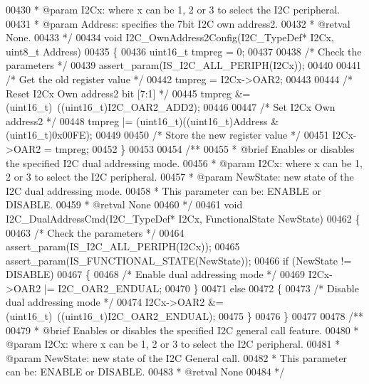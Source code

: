 \begin{DoxyCode}
00430 \textcolor{comment}{  * @param  I2Cx: where x can be 1, 2 or 3 to select the I2C peripheral.}
00431 \textcolor{comment}{  * @param  Address: specifies the 7bit I2C own address2.}
00432 \textcolor{comment}{  * @retval None.}
00433 \textcolor{comment}{  */}
00434 \textcolor{keywordtype}{void} I2C_OwnAddress2Config(I2C\_TypeDef* I2Cx, uint8\_t Address)
00435 \{
00436   uint16\_t tmpreg = 0;
00437 
00438   \textcolor{comment}{/* Check the parameters */}
00439   assert_param(IS\_I2C\_ALL\_PERIPH(I2Cx));
00440 
00441   \textcolor{comment}{/* Get the old register value */}
00442   tmpreg = I2Cx->OAR2;
00443 
00444   \textcolor{comment}{/* Reset I2Cx Own address2 bit [7:1] */}
00445   tmpreg &= (uint16\_t)~((uint16\_t)I2C_OAR2_ADD2);
00446 
00447   \textcolor{comment}{/* Set I2Cx Own address2 */}
00448   tmpreg |= (uint16\_t)((uint16\_t)Address & (uint16\_t)0x00FE);
00449 
00450   \textcolor{comment}{/* Store the new register value */}
00451   I2Cx->OAR2 = tmpreg;
00452 \}
00453 
00454 \textcolor{comment}{/**}
00455 \textcolor{comment}{  * @brief  Enables or disables the specified I2C dual addressing mode.}
00456 \textcolor{comment}{  * @param  I2Cx: where x can be 1, 2 or 3 to select the I2C peripheral.}
00457 \textcolor{comment}{  * @param  NewState: new state of the I2C dual addressing mode.}
00458 \textcolor{comment}{  *          This parameter can be: ENABLE or DISABLE.}
00459 \textcolor{comment}{  * @retval None}
00460 \textcolor{comment}{  */}
00461 \textcolor{keywordtype}{void} I2C_DualAddressCmd(I2C\_TypeDef* I2Cx, FunctionalState NewState)
00462 \{
00463   \textcolor{comment}{/* Check the parameters */}
00464   assert_param(IS\_I2C\_ALL\_PERIPH(I2Cx));
00465   assert_param(IS\_FUNCTIONAL\_STATE(NewState));
00466   \textcolor{keywordflow}{if} (NewState != DISABLE)
00467   \{
00468     \textcolor{comment}{/* Enable dual addressing mode */}
00469     I2Cx->OAR2 |= I2C_OAR2_ENDUAL;
00470   \}
00471   \textcolor{keywordflow}{else}
00472   \{
00473     \textcolor{comment}{/* Disable dual addressing mode */}
00474     I2Cx->OAR2 &= (uint16\_t)~((uint16\_t)I2C_OAR2_ENDUAL);
00475   \}
00476 \}
00477 
00478 \textcolor{comment}{/**}
00479 \textcolor{comment}{  * @brief  Enables or disables the specified I2C general call feature.}
00480 \textcolor{comment}{  * @param  I2Cx: where x can be 1, 2 or 3 to select the I2C peripheral.}
00481 \textcolor{comment}{  * @param  NewState: new state of the I2C General call.}
00482 \textcolor{comment}{  *          This parameter can be: ENABLE or DISABLE.}
00483 \textcolor{comment}{  * @retval None}
00484 \textcolor{comment}{  */}

\end{DoxyCode}
